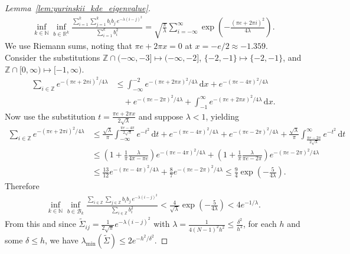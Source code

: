 \documentclass[11pt,lof]{puthesis}
\newcommand{\N}{\ensuremath{\mathbb{N}}}
\newcommand{\R}{\ensuremath{\mathbb{R}}}
\newcommand{\Z}{\ensuremath{\mathbb{Z}}}
\newcommand{\cB}{\ensuremath{\mathcal{B}}}
\newcommand{\diff}[1]{\,\mathrm{d}#1}
\theoremstyle{break}
\theoremstyle{proof}
\newtheorem{proof}{Proof}
\begin{document}
\begin{proof}[Lemma~\ref{lem:yurinskii_kde_eigenvalue}]
%
\begin{align*}
\inf_{k \in \N}
\inf_{b \in \R^k}
\frac{\sum_{i=1}^k \sum_{j=1}^k b_i b_j \, e^{-\lambda(i-j)^2}}
{\sum_{i=1}^k b_i^2}
=
\sqrt{\frac{\pi}{\lambda}}
\sum_{i=-\infty}^{\infty}
\exp \left( - \frac{(\pi e + 2 \pi i)^2}{4 \lambda} \right).
\end{align*}
%
We use Riemann sums,
noting that $\pi e + 2 \pi x = 0$ at
$x = -e/2 \approx -1.359$.
Consider the substitutions
$\Z \cap (-\infty, -3] \mapsto (-\infty, -2]$,
$\{-2, -1\} \mapsto \{-2, -1\}$, and
$\Z \cap [0, \infty) \mapsto [-1, \infty)$.
%
\begin{align*}
\sum_{i \in \Z}
e^{-(\pi e + 2 \pi i)^2 / 4 \lambda}
&\leq
\int_{-\infty}^{-2}
e^{ - (\pi e + 2 \pi x)^2/4 \lambda}
\diff x
+ e^{- (\pi e - 4 \pi)^2/4 \lambda} \\
&\quad+
e^{ - (\pi e - 2 \pi)^2 / 4 \lambda}
+ \int_{-1}^{\infty}
e^{ -(\pi e + 2 \pi x)^2 / 4 \lambda}
\diff x.
\end{align*}
%
Now use the substitution $t = \frac{\pi e + 2 \pi x}{2 \sqrt \lambda}$
and suppose $\lambda < 1$, yielding
%
\begin{align*}
\sum_{i \in \Z}
e^{-(\pi e + 2 \pi i)^2 / 4 \lambda}
&\leq
\frac{\sqrt \lambda}{\pi}
\int_{-\infty}^{\frac{\pi e - 4 \pi}{2 \sqrt \lambda}}
e^{-t^2}
\diff t
+ e^{- (\pi e - 4 \pi)^2/4 \lambda}
+ e^{ - (\pi e - 2 \pi)^2 / 4 \lambda}
+ \frac{\sqrt \lambda}{\pi}
\int_{\frac{\pi e - 2 \pi}{2 \sqrt \lambda}}^{\infty}
e^{-t^2}
\diff t \\
&\leq
\left( 1 + \frac{1}{\pi} \frac{\lambda}{4 \pi - \pi e} \right)
e^{-(\pi e - 4 \pi)^2 / 4 \lambda}
+
\left( 1 + \frac{1}{\pi} \frac{\lambda}{\pi e - 2 \pi} \right)
e^{- (\pi e - 2 \pi)^2 / 4 \lambda} \\
&\leq
\frac{13}{12}
e^{-(\pi e - 4 \pi)^2 / 4 \lambda}
+
\frac{8}{7}
e^{- (\pi e - 2 \pi)^2 / 4 \lambda}
\leq
\frac{9}{4}
\exp \left( - \frac{5}{4 \lambda} \right).
\end{align*}
%
Therefore
%
\begin{align*}
\inf_{k \in \N}
\inf_{b \in \cB_k}
\frac{\sum_{i \in \Z} \sum_{j \in \Z} b_i b_j \, e^{-\lambda(i-j)^2}}
{\sum_{i \in \Z} b_i^2}
< \frac{4}{\sqrt \lambda}
\exp \left( - \frac{5}{4 \lambda} \right)
< 4 e^{-1/\lambda}.
\end{align*}
%
From this and since
$\tilde\Sigma_{i j} = \frac{1}{2 \sqrt \pi} e^{-\lambda(i-j)^2}$
with $\lambda = \frac{1}{4(N-1)^2 h^2} \leq \frac{\delta^2}{h^2}$,
for each $h$ and some $\delta \leq h$,
we have $\lambda_{\min}(\tilde\Sigma) \leq 2 e^{-h^2/\delta^2}$.

\end{proof}
\end{document}
